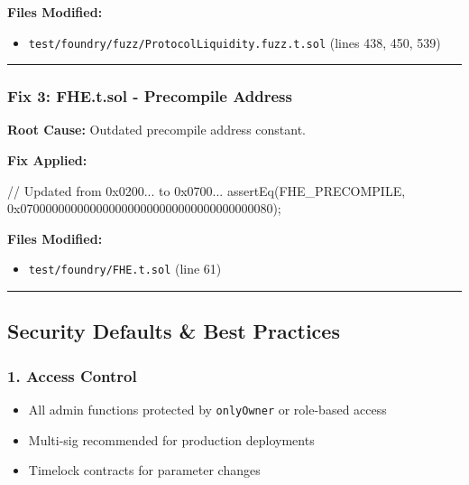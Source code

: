 \documentclass[
]{article}
\newenvironment{Shaded}{}{}
\newcommand{\NormalTok}[1]{#1}
\providecommand{\tightlist}{%
  \setlength{\itemsep}{0pt}\setlength{\parskip}{0pt}}
\begin{document}
\textbf{Files Modified:}

\begin{itemize}
\tightlist
\item
  \texttt{test/foundry/fuzz/ProtocolLiquidity.fuzz.t.sol} (lines 438,
  450, 539)
\end{itemize}

\begin{center}\rule{0.5\linewidth}{0.5pt}\end{center}

\subsubsection{Fix 3: FHE.t.sol - Precompile
Address}\label{fix-3-fhetsol---precompile-address}

\textbf{Root Cause:} Outdated precompile address constant.

\textbf{Fix Applied:}

\begin{Shaded}
\begin{Highlighting}[]
\NormalTok{// Updated from 0x0200... to 0x0700...}
\NormalTok{assertEq(FHE\_PRECOMPILE, 0x0700000000000000000000000000000000000080);}
\end{Highlighting}
\end{Shaded}

\textbf{Files Modified:}

\begin{itemize}
\tightlist
\item
  \texttt{test/foundry/FHE.t.sol} (line 61)
\end{itemize}

\begin{center}\rule{0.5\linewidth}{0.5pt}\end{center}

\subsection{Security Defaults \& Best
Practices}\label{security-defaults--best-practices}

\subsubsection{1. Access Control}\label{1-access-control}

\begin{itemize}
\tightlist
\item
  All admin functions protected by \texttt{onlyOwner} or role-based
  access
\item
  Multi-sig recommended for production deployments
\item
  Timelock contracts for parameter changes
\end{itemize}
\end{document}
